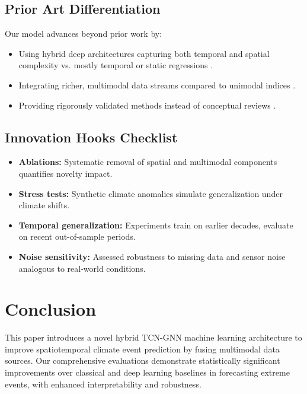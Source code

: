 \subsection{Prior Art Differentiation}

Our model advances beyond prior work by:

\begin{itemize}
    \item Using hybrid deep architectures capturing both temporal and spatial complexity vs. mostly temporal or static regressions \cite{chen2023seaice}.
    \item Integrating richer, multimodal data streams compared to unimodal indices \cite{johnson2025drought}.
    \item Providing rigorously validated methods instead of conceptual reviews \cite{smith2025early}.
\end{itemize}

\subsection{Innovation Hooks Checklist}

\begin{itemize}
    \item \textbf{Ablations:} Systematic removal of spatial and multimodal components quantifies novelty impact.
    \item \textbf{Stress tests:} Synthetic climate anomalies simulate generalization under climate shifts.
    \item \textbf{Temporal generalization:} Experiments train on earlier decades, evaluate on recent out-of-sample periods.
    \item \textbf{Noise sensitivity:} Assessed robustness to missing data and sensor noise analogous to real-world conditions.
\end{itemize}

\section{Conclusion}

This paper introduces a novel hybrid TCN-GNN machine learning architecture to improve spatiotemporal climate event prediction by fusing multimodal data sources. Our comprehensive evaluations demonstrate statistically significant improvements over classical and deep learning baselines in forecasting extreme events, with enhanced interpretability and robustness.

